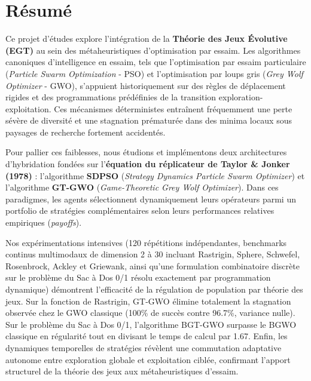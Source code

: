 \documentclass[12pt,a4paper]{report}
\begin{document}
\setcounter{page}{1}

\chapter*{Résumé}

Ce projet d'études explore l'intégration de la \textbf{Théorie des Jeux Évolutive (EGT)} au sein des métaheuristiques d'optimisation par essaim. Les algorithmes canoniques d'intelligence en essaim, tels que l'optimisation par essaim particulaire (\textit{Particle Swarm Optimization} - PSO) et l'optimisation par loups gris (\textit{Grey Wolf Optimizer} - GWO), s'appuient historiquement sur des règles de déplacement rigides et des programmations prédéfinies de la transition exploration-exploitation. Ces mécanismes déterministes entraînent fréquemment une perte sévère de diversité et une stagnation prématurée dans des minima locaux sous paysages de recherche fortement accidentés. 

Pour pallier ces faiblesses, nous étudions et implémentons deux architectures d'hybridation fondées sur l'\textbf{équation du réplicateur de Taylor \& Jonker (1978)} : l'algorithme \textbf{SDPSO} (\textit{Strategy Dynamics Particle Swarm Optimizer}) et l'algorithme \textbf{GT-GWO} (\textit{Game-Theoretic Grey Wolf Optimizer}). Dans ces paradigmes, les agents sélectionnent dynamiquement leurs opérateurs parmi un portfolio de stratégies complémentaires selon leurs performances relatives empiriques (\textit{payoffs}). 

Nos expérimentations intensives (120 répétitions indépendantes, benchmarks continus multimodaux de dimension 2 à 30 incluant Rastrigin, Sphere, Schwefel, Rosenbrock, Ackley et Griewank, ainsi qu'une formulation combinatoire discrète sur le problème du Sac à Dos 0/1 résolu exactement par programmation dynamique) démontrent l'efficacité de la régulation de population par théorie des jeux. Sur la fonction de Rastrigin, GT-GWO élimine totalement la stagnation observée chez le GWO classique (100\% de succès contre 96.7\%, variance nulle). Sur le problème du Sac à Dos 0/1, l'algorithme BGT-GWO surpasse le BGWO classique en régularité tout en divisant le temps de calcul par 1.67. Enfin, les dynamiques temporelles de stratégies révèlent une commutation adaptative autonome entre exploration globale et exploitation ciblée, confirmant l'apport structurel de la théorie des jeux aux métaheuristiques d'essaim.
\end{document}

